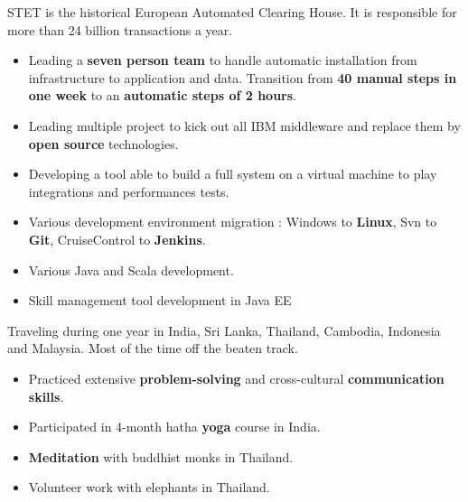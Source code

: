 \documentclass[10pt,a4paper,ragged2e]{altacv}
\begin{document}
	
		STET is the historical European Automated Clearing House. It is responsible for more than 24 billion transactions a year.
	
		\medskip
		\begin{itemize}
			\item Leading a \textbf{seven person team} to handle automatic installation from infrastructure to application and data. Transition from \textbf{40 manual steps in one week} to an \textbf{automatic steps of 2 hours}.
			\item Leading multiple project to kick out all IBM middleware and replace them by\textbf{ open source} technologies.
			\item Developing a tool able to build a full system on a virtual machine to play integrations and performances tests.
		\end{itemize}
	\divider

		\begin{itemize}
			\item Various development environment migration : Windows to \textbf{Linux}, Svn to \textbf{Git}, CruiseControl to \textbf{Jenkins}.
			\item Various Java and Scala development.
		\end{itemize}
	\divider

		\begin{itemize}
			\item Skill management tool development in Java EE
		\end{itemize}

\bigskip
{}
	
		Traveling during one year in India, Sri Lanka, Thailand, Cambodia, Indonesia and Malaysia. Most of the time off the beaten track. 
		
		\medskip
		\begin{itemize}
			\item Practiced extensive \textbf{problem-solving} and cross-cultural \textbf{communication skills}.
			\item Participated in 4-month hatha \textbf{yoga} course in India.
			\item \textbf{Meditation} with buddhist monks in Thailand.
			\item Volunteer work with elephants in Thailand.
		\end{itemize}
\end{document}
